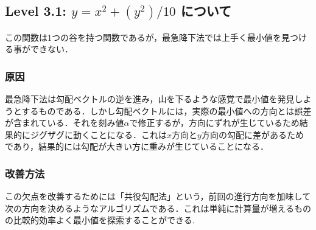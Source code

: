 \subsection{Level 3.1: $y = x^2 + (y^2)/10$ について}
この関数は1つの谷を持つ関数であるが，最急降下法では上手く最小値を見つける事ができない．
\subsubsection{原因}
最急降下法は勾配ベクトルの逆を進み，山を下るような感覚で最小値を発見しようとするものである．しかし勾配ベクトルには，実際の最小値への方向とは誤差が含まれている．それを刻み値$\alpha$で修正するが，方向にずれが生じているため結果的にジグザグに動くことになる．これは$x$方向と$y$方向の勾配に差があるためであり，結果的には勾配が大きい方に重みが生じていることになる．
\subsubsection{改善方法}
この欠点を改善するためには「共役勾配法」という，前回の進行方向を加味して次の方向を決めるようなアルゴリズムである．これは単純に計算量が増えるものの比較的効率よく最小値を探索することができる.


